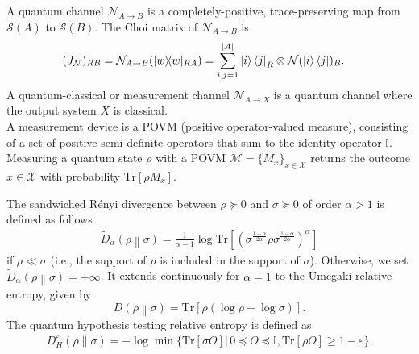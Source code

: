 \documentclass[a4paper,onecolumn,11pt,accepted=2025-10-01]{quantumarticle}
\newcommand*{\dI}{\mathbb{I}}
\newcommand*{\cN}{\mathcal{N}}
\newcommand*{\cM}{\mathcal{M}}
\newcommand*{\cS}{\mathcal{S}}
\newcommand*{\cX}{\mathcal{X}}
\newcommand*{\eps}{\varepsilon}
\newcommand*{\tr}[1]{\mathrm{Tr}\left[#1\right]}
\newcommand*{\proj}[1]{|#1\rangle\!\langle #1|}
\newcommand*{\mge}{\succcurlyeq}
\newcommand*{\mle}{\preccurlyeq}
\begin{document}
A quantum channel $\cN_{A\rightarrow B} $ is a completely-positive, trace-preserving map from $\cS(A)$ to $\cS(B)$. 
The Choi matrix of $\cN_{A\rightarrow B} $ is
\begin{align}
(J_{\cN})_{RB}= \cN_{A\rightarrow B}(\proj{w}_{RA}) 
&=   \sum_{i,j=1}^{|A|}  \ket{i}\bra{j}_{R} \otimes \cN( \ket{i}\bra{j})_{B}.
\end{align}
A quantum-classical or measurement channel $\cN_{A\rightarrow X}$ is a quantum channel where the output system $X$ is classical. 
\\A measurement device is a POVM (positive operator-valued measure), consisting of a set of positive semi-definite operators that sum to the identity operator $\dI$. Measuring a quantum state $\rho$ with a POVM $\cM = \{M_x\}_{x\in \cX}$ returns the outcome $x\in \cX$ with probability $\tr{\rho M_x}$. 

The sandwiched R\'enyi divergence \cite{MDSFT2013on,WWY2014strong} between $\rho \mge 0$ and $\sigma \mge 0$ of order $\alpha>1$ is defined as follows 
\begin{align}\label{def:sand-div}
    \widetilde{D}_\alpha\left(\rho \middle\| \sigma \right) = \frac{1}{\alpha-1}\log \tr{\left(\sigma^{\frac{1-\alpha}{2\alpha}}\rho \sigma^{\frac{1-\alpha}{2\alpha}}\right)^{\alpha}}
\end{align}
if $\rho \ll \sigma$ (i.e., the support of $\rho$ is included in the support of $\sigma$). Otherwise, we set $   \widetilde{D}_\alpha\left(\rho \middle\| \sigma \right) = +\infty$. It extends  continuously for $\alpha=1$ to the Umegaki relative entropy, given by  
\begin{equation}
    D\left(\rho \middle\| \sigma \right) = \tr{\rho (\log\rho-\log\sigma)}.
\end{equation}
The quantum hypothesis testing relative entropy is defined as 
\begin{align}
   D_H^{\eps}(\rho\| \sigma) = -\log \min \Big\{\tr{\sigma O} \Big| \,0\mle O\mle \dI, \tr{\rho O}\ge 1-\eps \Big\}. 
\end{align}
\end{document}
